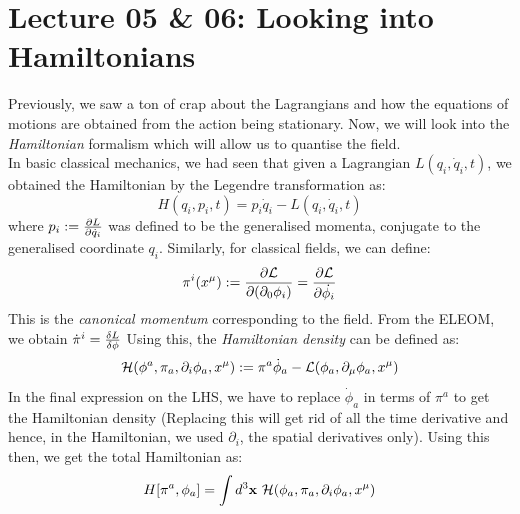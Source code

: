 \section*{Lecture 05 \& 06: Looking into Hamiltonians}
Previously, we saw a ton of crap about the Lagrangians and how the equations of motions are obtained from the action being stationary. Now, we will look into the \textit{Hamiltonian} formalism which will allow us to quantise the field. \\[0.2cm]
In basic classical mechanics, we had seen that given a Lagrangian $L(q_i,\dot{q}_i,t)$, we obtained the Hamiltonian by the Legendre transformation as:
$$H(q_i, p_i,t) = p_i \dot{q}_i - L(q_i, \dot{q}_i,t)$$
where $p_i := \pdv{L}{\dot{q}_i}$ was defined to be the generalised momenta, conjugate to the generalised coordinate $q_i$. Similarly, for classical fields, we can define:
$$\pi^i(x^\mu) := \pdv{\mathcal L}{(\partial_0 \phi_i)} = \pdv{\mathcal L}{\dot{\phi_i}}$$
This is the \textit{canonical momentum} corresponding to the field. From the ELEOM, we obtain $\dot{\pi}^i = \frac{\delta L}{\delta \phi}$
Using this, the \textit{Hamiltonian density} can be defined as:
$$\mathcal H(\phi^a, \pi_a, \partial_i \phi_a,x^\mu) := \pi^a \dot{\phi}_a - \mathcal L(\phi_a, \partial_\mu\phi_a, x^\mu)$$
In the final expression on the LHS, we have to replace $\dot{\phi}_a$ in terms of $\pi^a$ to get the Hamiltonian density (Replacing this will get rid of all the time derivative and hence, in the Hamiltonian, we used $\partial_i$, the spatial derivatives only). Using this then, we get the total Hamiltonian as:
$$H[\pi^a, \phi_a] = \int d^3\vb{x}\ \mathcal H(\phi_a, \pi_a, \partial_i \phi_a,x^\mu)$$
